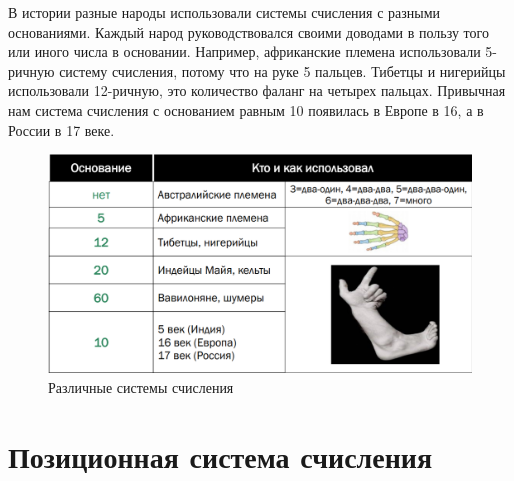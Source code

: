 В истории разные народы использовали системы счисления с разными основаниями. Каждый народ руководствовался своими доводами в пользу того или иного числа в основании. Например, африканские племена использовали 5-ричную систему счисления, потому что на руке 5 пальцев. Тибетцы и нигерийцы использовали 12-ричную, это количество фаланг на четырех пальцах. Привычная нам система счисления с основанием равным 10 появилась в Европе в 16, а в России в 17 веке.
\begin{figure} [h!]
\center\includegraphics[width=\textwidth]{images/2_1.png}
\caption{Различные системы счисления}
\end{figure}

\section{Позиционная система счисления}

